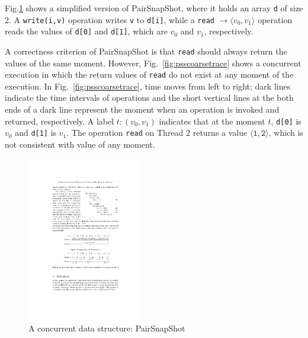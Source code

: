 \documentclass[runningheads]{llncs}
\newcommand{\pair}[1]{{\langle{#1}\rangle}}
\begin{document}
Fig.\ref{fig:pairsnapshot} shows a simplified version of PairSnapShot, where it holds an array \texttt{d} of size 2. A \texttt{write(i,v)} operation writes \texttt{v} to \texttt{d[i]}, while a \texttt{read} \texttt{$\to \langle v_0,v_1\rangle$} operation reads the values of \texttt{d[0]} and \texttt{d[1]}, which are $v_0$ and $v_1$, respectively.

 A correctness criterion of PairSnapShot is that \texttt{read} should always return the values of the same moment. However, 
Fig.~\ref{fig:psscoarsetrace} shows a concurrent execution in which the return values of \texttt{read} do not exist at any moment of the execution. 
In Fig.~\ref{fig:psscoarsetrace}, time moves from left to right; dark lines indicate the time intervals of operations and  
the short vertical lines at the both ends of a dark line represent the moment when an operation is invoked and returned, respectively.
A label ${t:(v_0,v_1)}$ indicates that at the moment $t$,  \texttt{d[0]} is $v_0$ and \texttt{d[1]} is $v_1$.
  The operation \texttt{read} on Thread 2 returns a value $\mathtt{\pair{1,2}}$,
  which is not consistent with value of any moment. 
  
    \begin{figure}
\centering

   \includegraphics[width = 2in]{pss.pdf}
        \caption{A concurrent data structure: PairSnapShot}
        \label{fig:pairsnapshot}
\end{figure}
\end{document}
